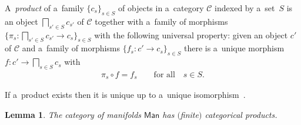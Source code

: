 \documentclass[pdftex]{sigma}
\numberwithin{equation}{section}
\newtheorem{Lemma}[Theorem]{Lemma}
\begin{document}
\begin{Definition}
A~{\it product} of a~family $\{c_s\}_{s\in S}$ of objects in a~category $\mathscr{C}$ indexed by a~set~$S$ is an object
$\bigsqcap_{s'\in S}c_{s'}$ of $\mathscr{C}$ together with a~family of morphisms $\{\pi_s\colon \bigsqcap_{s'\in
S}c_{s'} \to c_s\}_{s\in S}$ with the following universal property: given an object $c'$ of $\mathscr{C}$ and a~family
of morphisms $\{f_s\colon c'\to c_s\}_{s\in S}$ there is a~unique morphism $f\colon c'\to \bigsqcap_{s\in S}c_s$ with
\begin{gather*}
\pi_s \circ f = f_s
\qquad
\text{for all}
\quad
s\in S.
\end{gather*}
\end{Definition}

\begin{Remark}
If a~product exists then it is unique up to a~unique isomorphism~\cite{Awodey}.
\end{Remark}

\begin{Lemma}
The category of manifolds $\mathsf{Man}$ has $($finite$)$ categorical products.
\label{empt:cat-prod}
\end{Lemma}
\end{document}
